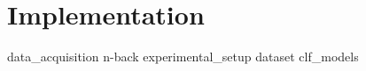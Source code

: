 \chapter{Implementation} \label{sec:impl}

{data_acquisition}
{n-back}
{experimental_setup}
{dataset}
{clf_models}
